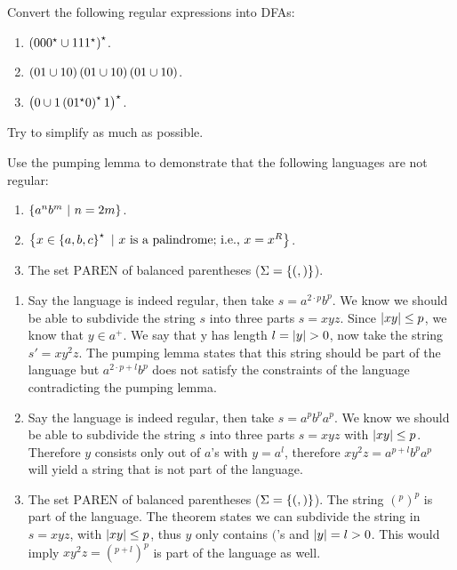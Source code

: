 \documentclass{article}
\begin{document}
\begin{question}
Convert the following regular expressions into DFAs:
\begin{enumerate}
 \item $\left( 000^{\star}\cup 111^{\star} \right)^{\star}$.
 \item $\left( 01\cup 10 \right)\left( 01\cup 10 \right)\left( 01\cup 10 \right)$.
 \item $\left( 0\cup 1\left( 01^{\star}0 \right)^{\star}1 \right)^{\star}$.
\end{enumerate}
Try to simplify as much as possible.
\begin{answer}
\end{answer}
\end{question}
\begin{question}
Use the pumping lemma to demonstrate that the following languages are not regular:
\begin{enumerate}
 \item $\left\{ a^nb^m\ |\ n = 2m \right\}$.
 \item $\left\{ x\in\left\{ a,b,c \right\}^{\star}\ |\ \mbox{$x$ is a palindrome; i.e., $x=x^R$} \right\}$.
 \item The set $\mbox{PAREN}$ of balanced parentheses ($\Sigma=\left\{ (,) \right\}$).
\end{enumerate}
\begin{answer}
\begin{enumerate}
 \item Say the language is indeed regular, then take $s=a^{2\cdot p}b^p$. We know we should be able to subdivide the string $s$ into three parts $s=xyz$. Since $\left|xy\right|\leq p$, we know that $y\in a^+$. We say that y has length $l=\abs{y}>0$, now take the string $s'=xy^2z$. The pumping lemma states that this string should be part of the language but $a^{2\cdot p+l}b^p$ does not satisfy the constraints of the language contradicting the pumping lemma.
 \item Say the language is indeed regular, then take $s=a^pb^pa^p$. We know we should be able to subdivide the string $s$ into three parts $s=xyz$ with $\left|xy\right|\leq p$. Therefore $y$ consists only out of $a$'s with $y=a^l$, therefore $xy^2z=a^{p+l}b^pa^p$ will yield a string that is not part of the language.
 \item The set $\mbox{PAREN}$ of balanced parentheses ($\Sigma=\left\{ (,) \right\}$). The string $(^p)^p$ is part of the language. The theorem states we can subdivide the string in $s=xyz$, with $\left|xy\right|\leq p$, thus $y$ only contains $($'s and $\left|y\right|=l>0$. This would imply $xy^2z=(^{p+l})^{p}$ is part of the language as well.
\end{enumerate}
\end{answer}
\end{question}
\end{document}
